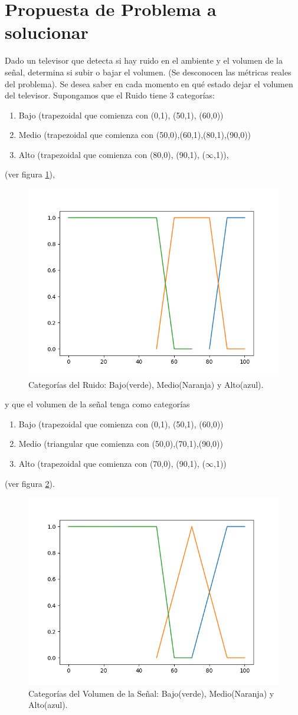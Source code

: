 \documentclass[11pt]{article}
\begin{document}
\section{Propuesta de Problema a solucionar}
Dado un televisor que detecta si hay ruido en el ambiente y el volumen de la se\~nal, determina si subir o bajar el volumen. (Se desconocen las m\'etricas reales del problema). Se desea saber en cada momento en qu\'e estado dejar el volumen del televisor. Supongamos que el Ruido tiene 3 categor\'ias:
\begin{enumerate}
	\item Bajo (trapezoidal que comienza con (0,1), (50,1), (60,0))
	\item Medio (trapezoidal que comienza con (50,0),(60,1),(80,1),(90,0))
	\item Alto (trapezoidal que comienza con (80,0), (90,1), ($\infty$,1)),
\end{enumerate}
(ver figura \ref{fig:ruido}),
\begin{figure}[ht]
	\centering
	\includegraphics[width=.5\textwidth]{images/Ruido.png}			
	\caption{Categor\'ias del Ruido:  Bajo(verde), Medio(Naranja) y Alto(azul).}
	\label{fig:ruido}	
\end{figure}
 y que el volumen de la se\~nal tenga como categor\'ias
\begin{enumerate}
	\item Bajo (trapezoidal que comienza con (0,1), (50,1), (60,0))
	\item Medio (triangular que comienza con (50,0),(70,1),(90,0))
	\item Alto (trapezoidal que comienza con (70,0), (90,1), ($\infty$,1))
\end{enumerate}
(ver figura \ref{fig:volSig}).\\
\begin{figure}[ht]
	\centering
	\includegraphics[width=.5\textwidth]{images/VolumenDeLaSignal.png}			
	\caption{Categor\'ias del Volumen de la Se\~nal:  Bajo(verde), Medio(Naranja) y Alto(azul).}
	\label{fig:volSig}	
\end{figure}
\end{document}
